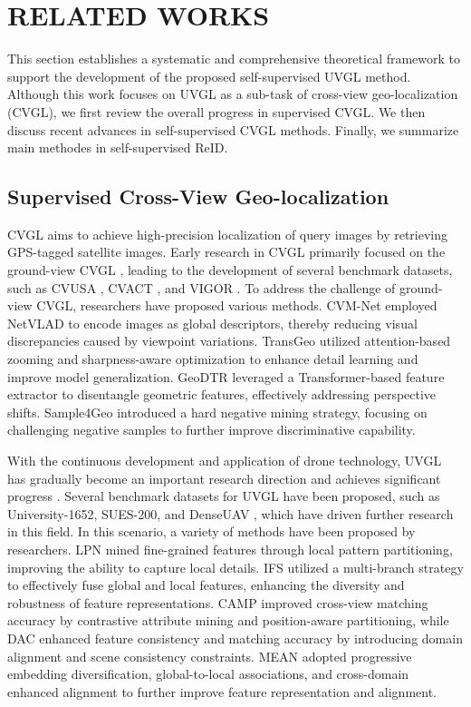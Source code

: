 \section{RELATED WORKS}
\label{related works}
This section establishes a systematic and comprehensive theoretical framework to support the development of the proposed self-supervised UVGL method. Although this work focuses on UVGL as a sub-task of cross-view geo-localization (CVGL), we first review the overall progress in supervised CVGL. We then discuss recent advances in self-supervised CVGL methods. Finally, we summarize main methodes in self-supervised ReID.
\subsection{Supervised Cross-View Geo-localization}
CVGL aims to achieve high-precision localization of query images by retrieving GPS-tagged satellite images. Early research in CVGL primarily focused on the ground-view CVGL \cite{Shi_Yu_Liu_Zhang_Li_2020,zhang2023cross,10601183}, leading to the development of several benchmark datasets, such as CVUSA \cite{zhai2017predicting}, CVACT \cite{2019Lending}, and VIGOR \cite{zhu2021vigor}. To address the challenge of ground-view CVGL, researchers have proposed various methods. CVM-Net 
\cite{Hu_2018_CVPR} employed NetVLAD \cite{arandjelovic2016netvlad} to encode images as global descriptors, thereby reducing visual discrepancies caused by viewpoint variations. TransGeo \cite{zhu2022transgeo} utilized attention-based zooming and sharpness-aware optimization to enhance detail learning and improve model generalization. GeoDTR \cite{zhang2023cross} leveraged a Transformer-based \cite{liu2022swin} feature extractor to disentangle geometric features, effectively addressing perspective shifts. Sample4Geo \cite{deuser2023sample4geo} introduced a hard negative mining strategy, focusing on challenging negative samples to further improve discriminative capability.

With the continuous development and application of drone technology, UVGL has gradually become an important research direction and achieves significant progress \cite{wu2024camp,lv2024direction,du2024ccr}. Several benchmark datasets for UVGL have been proposed, such as University-1652\cite{zheng2020university}, SUES-200, \cite{zhu2023sues} and DenseUAV \cite{DenseUAV}, which have driven further research in this field. In this scenario, a variety of methods have been proposed by researchers. LPN \cite{wang2021each} mined fine-grained features through local pattern partitioning, improving the ability to capture local details. IFS \cite{ge2024multibranch} utilized a multi-branch strategy to effectively fuse global and local features, enhancing the diversity and robustness of feature representations. CAMP \cite{wu2024camp} improved cross-view matching accuracy by contrastive attribute mining and position-aware partitioning, while DAC \cite{xia2024enhancing} enhanced feature consistency and matching accuracy by introducing domain alignment and scene consistency constraints. MEAN \cite{chen2024multi} adopted progressive embedding diversification, global-to-local associations, and cross-domain enhanced alignment to further improve feature representation and alignment.

